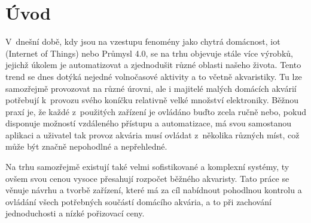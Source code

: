 \chapter*{Úvod}
{}


V~dnešní době, kdy jsou na vzestupu fenomény jako chytrá domácnost, \acs{iot} (Internet of Things) nebo Průmysl 4.0, se na trhu objevuje stále více výrobků, jejichž úkolem je automatizovat a zjednodušit různé oblasti našeho života. Tento trend se dnes dotýká nejedné volnočasové aktivity a to včetně akvaristiky. Tu lze samozřejmě provozovat na různé úrovni, ale i majitelé malých domácích akvárií potřebují k~provozu svého koníčku relativně velké množství elektroniky. 
Běžnou praxí je, že každé z~použitých zařízení je ovládáno buďto zcela ručně nebo, pokud disponuje možností vzdáleného přístupu a automatizace, má svou samostanou aplikaci a uživatel tak provoz akvária musí ovládat z~několika různých míst, což může být značně nepohodlné a nepřehledné.

Na trhu samozřejmě existují také velmi sofistikované a komplexní systémy, ty ovšem svou cenou vysoce přesahují rozpočet běžného  akvaristy. Tato práce se věnuje návrhu a tvorbě zařízení, které má za cíl nabídnout pohodlnou kontrolu a ovládání všech potřebných součástí domácího akvária, a to při zachování jednoduchosti a nízké pořizovací ceny.
